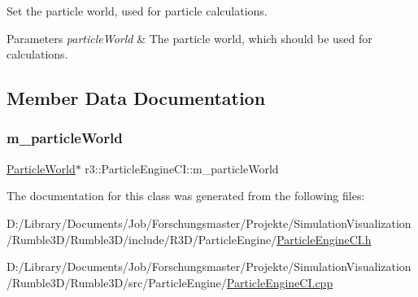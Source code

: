 Set the particle world, used for particle calculations. 


\begin{DoxyParams}{Parameters}
{\em particle\+World} & The particle world, which should be used for calculations. \\
\hline
\end{DoxyParams}


\subsection{Member Data Documentation}
\mbox{\label{classr3_1_1_particle_engine_c_i_ad13321df475d526a7a2ed34e46cc10ee}} 
\subsubsection{\texorpdfstring{m\+\_\+particle\+World}{m\_particleWorld}}
{\footnotesize\ttfamily \mbox{\hyperlink{classr3_1_1_particle_world}{Particle\+World}}$\ast$ r3\+::\+Particle\+Engine\+C\+I\+::m\+\_\+particle\+World\hspace{0.3cm}{\ttfamily [protected]}}



The documentation for this class was generated from the following files\+:\begin{DoxyCompactItemize}
\item 
D\+:/\+Library/\+Documents/\+Job/\+Forschungsmaster/\+Projekte/\+Simulation\+Visualization/\+Rumble3\+D/\+Rumble3\+D/include/\+R3\+D/\+Particle\+Engine/\mbox{\hyperlink{_particle_engine_c_i_8h}{Particle\+Engine\+C\+I.\+h}}\item 
D\+:/\+Library/\+Documents/\+Job/\+Forschungsmaster/\+Projekte/\+Simulation\+Visualization/\+Rumble3\+D/\+Rumble3\+D/src/\+Particle\+Engine/\mbox{\hyperlink{_particle_engine_c_i_8cpp}{Particle\+Engine\+C\+I.\+cpp}}\end{DoxyCompactItemize}

